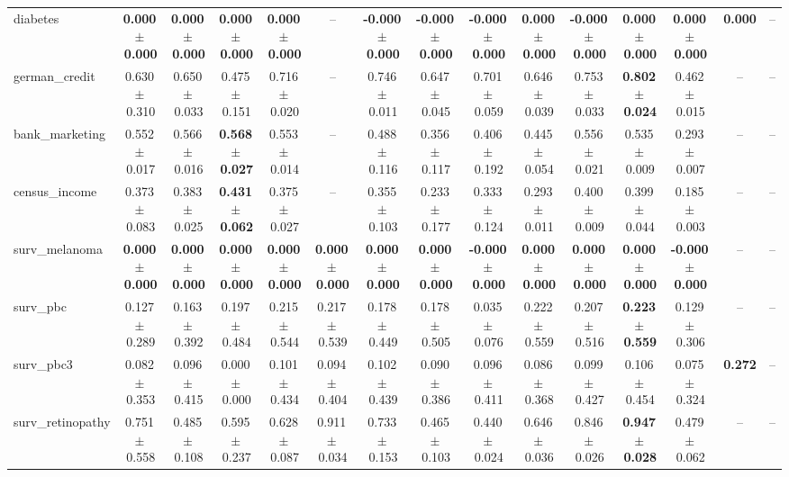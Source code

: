 \documentclass[8pt]{extarticle}
\begin{document}
\begin{longtable}{l*{14}{c}}
diabetes & \textbf{0.000\,$\pm$\,0.000} & \textbf{0.000\,$\pm$\,0.000} & \textbf{0.000\,$\pm$\,0.000} & \textbf{0.000\,$\pm$\,0.000} & -- & \textbf{-0.000\,$\pm$\,0.000} & \textbf{-0.000\,$\pm$\,0.000} & \textbf{-0.000\,$\pm$\,0.000} & \textbf{0.000\,$\pm$\,0.000} & \textbf{-0.000\,$\pm$\,0.000} & \textbf{0.000\,$\pm$\,0.000} & \textbf{0.000\,$\pm$\,0.000} & \textbf{0.000} & -- \\
german\_credit & 0.630\,$\pm$\,0.310 & 0.650\,$\pm$\,0.033 & 0.475\,$\pm$\,0.151 & 0.716\,$\pm$\,0.020 & -- & 0.746\,$\pm$\,0.011 & 0.647\,$\pm$\,0.045 & 0.701\,$\pm$\,0.059 & 0.646\,$\pm$\,0.039 & 0.753\,$\pm$\,0.033 & \textbf{0.802\,$\pm$\,0.024} & 0.462\,$\pm$\,0.015 & -- & -- \\
bank\_marketing & 0.552\,$\pm$\,0.017 & 0.566\,$\pm$\,0.016 & \textbf{0.568\,$\pm$\,0.027} & 0.553\,$\pm$\,0.014 & -- & 0.488\,$\pm$\,0.116 & 0.356\,$\pm$\,0.117 & 0.406\,$\pm$\,0.192 & 0.445\,$\pm$\,0.054 & 0.556\,$\pm$\,0.021 & 0.535\,$\pm$\,0.009 & 0.293\,$\pm$\,0.007 & -- & -- \\
census\_income & 0.373\,$\pm$\,0.083 & 0.383\,$\pm$\,0.025 & \textbf{0.431\,$\pm$\,0.062} & 0.375\,$\pm$\,0.027 & -- & 0.355\,$\pm$\,0.103 & 0.233\,$\pm$\,0.177 & 0.333\,$\pm$\,0.124 & 0.293\,$\pm$\,0.011 & 0.400\,$\pm$\,0.009 & 0.399\,$\pm$\,0.044 & 0.185\,$\pm$\,0.003 & -- & -- \\
surv\_melanoma & \textbf{0.000\,$\pm$\,0.000} & \textbf{0.000\,$\pm$\,0.000} & \textbf{0.000\,$\pm$\,0.000} & \textbf{0.000\,$\pm$\,0.000} & \textbf{0.000\,$\pm$\,0.000} & \textbf{0.000\,$\pm$\,0.000} & \textbf{0.000\,$\pm$\,0.000} & \textbf{-0.000\,$\pm$\,0.000} & \textbf{0.000\,$\pm$\,0.000} & \textbf{0.000\,$\pm$\,0.000} & \textbf{0.000\,$\pm$\,0.000} & \textbf{-0.000\,$\pm$\,0.000} & -- & -- \\
surv\_pbc & 0.127\,$\pm$\,0.289 & 0.163\,$\pm$\,0.392 & 0.197\,$\pm$\,0.484 & 0.215\,$\pm$\,0.544 & 0.217\,$\pm$\,0.539 & 0.178\,$\pm$\,0.449 & 0.178\,$\pm$\,0.505 & 0.035\,$\pm$\,0.076 & 0.222\,$\pm$\,0.559 & 0.207\,$\pm$\,0.516 & \textbf{0.223\,$\pm$\,0.559} & 0.129\,$\pm$\,0.306 & -- & -- \\
surv\_pbc3 & 0.082\,$\pm$\,0.353 & 0.096\,$\pm$\,0.415 & 0.000\,$\pm$\,0.000 & 0.101\,$\pm$\,0.434 & 0.094\,$\pm$\,0.404 & 0.102\,$\pm$\,0.439 & 0.090\,$\pm$\,0.386 & 0.096\,$\pm$\,0.411 & 0.086\,$\pm$\,0.368 & 0.099\,$\pm$\,0.427 & 0.106\,$\pm$\,0.454 & 0.075\,$\pm$\,0.324 & \textbf{0.272} & -- \\
surv\_retinopathy & 0.751\,$\pm$\,0.558 & 0.485\,$\pm$\,0.108 & 0.595\,$\pm$\,0.237 & 0.628\,$\pm$\,0.087 & 0.911\,$\pm$\,0.034 & 0.733\,$\pm$\,0.153 & 0.465\,$\pm$\,0.103 & 0.440\,$\pm$\,0.024 & 0.646\,$\pm$\,0.036 & 0.846\,$\pm$\,0.026 & \textbf{0.947\,$\pm$\,0.028} & 0.479\,$\pm$\,0.062 & -- & -- \\

\end{longtable}
\end{document}
